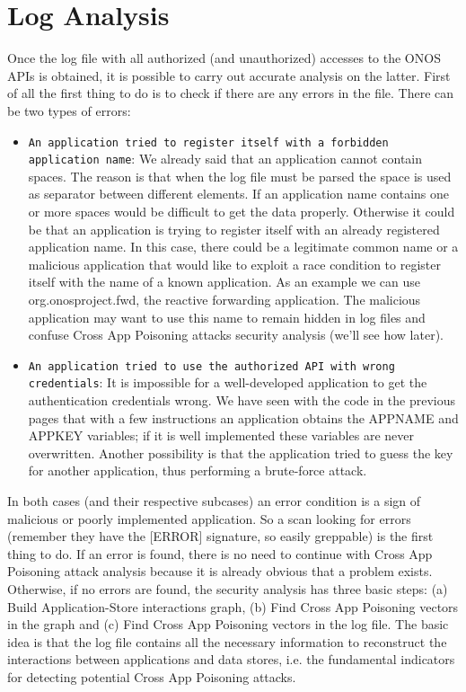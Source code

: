\documentclass[a4paper,10pt]{memoir}
\begin{document}
\section{Log Analysis}
Once the log file with all authorized (and unauthorized) accesses to the ONOS APIs is obtained, it is possible to carry out accurate analysis on the latter. First of all the first thing to do is to check if there are any errors in the file. There can be two types of errors: 
\begin{itemize}
    \item\texttt{An application tried to register itself with a forbidden application name}: We already said that an application cannot contain spaces. The reason is that when the log file must be parsed the space is used as separator between different elements. If an application name contains one or more spaces would be difficult to get the data properly. Otherwise it could be that an application is trying to register itself with an already registered application name. In this case, there could be a legitimate common name or a malicious application that would like to exploit a race condition to register itself with the name of a known application. As an example we can use org.onosproject.fwd, the reactive forwarding application. The malicious application may want to use this name to remain hidden in log files and confuse Cross App Poisoning attacks security analysis (we'll see how later).
    \item\texttt{An application tried to use the authorized API with wrong credentials}: It is impossible for a well-developed application to get the authentication credentials wrong. We have seen with the code in the previous pages that with a few instructions an application obtains the APPNAME and APPKEY variables; if it is well implemented these variables are never overwritten. Another possibility is that the application tried to guess the key for another application, thus performing a brute-force attack.
\end{itemize}
In both cases (and their respective subcases) an error condition is a sign of malicious or poorly implemented application. So a scan looking for errors (remember they have the [ERROR] signature, so easily greppable) is the first thing to do. If an error is found, there is no need to continue with Cross App Poisoning attack analysis because it is already obvious that a problem exists.
Otherwise, if no errors are found, the security analysis has three basic steps: (a) Build Application-Store interactions graph, (b) Find Cross App Poisoning vectors in the graph and (c) Find Cross App Poisoning vectors in the log file. The basic idea is that the log file contains all the necessary information to reconstruct the interactions between applications and data stores, i.e. the fundamental indicators for detecting potential Cross App Poisoning attacks.
\end{document}
